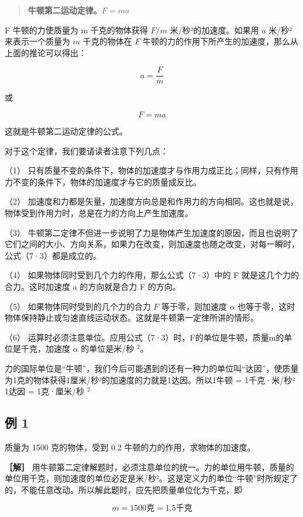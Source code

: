 \begin{quote}
\textbf{牛顿第二运动定律。\(F = ma\)}
\end{quote}

F 牛顿的力使质量为 m 千克的物体获得 \(F / m\) 米/秒²的加速度。如果用
\(a\) 米/秒²来表示一个质量为 \(m\) 千克的物体在 \(F\)
牛顿的力的作用下所产生的加速度，那么从上面的推论可以得出：

\[
a = \frac {F}{m}
\]

或

\[
F = m a \tag{7.3}
\]

这就是牛顿第二运动定律的公式。

对于这个定律，我们要请读者注意下列几点：

（1）
只有质量不变的条件下，物体的加速度才与作用力成正比；同样，只有作用力不变的条件下，物体的加速度才与它的质量成反比。

（2）
加速度和力都是矢量，加速度方向总是和作用力的方向相同。这也就是说，物体受到作用力时，总是在力的方向上产生加速度。

（3）
牛顿第二定律不但进一步说明了力是物体产生加速度的原因，而且也说明了它们之间的大小、方向关系，如果力在改变，则加速度也随之改变，对每一瞬时，公式（7·3）都是成立的。

（4） 如果物体同时受到几个力的作用，那么公式（7·3）中的 F
就是这几个力的合力。这时加速度 a 的方向就是合力 F 的方向。

（5） 如果物体同时受到的几个力的合力 \(F\) 等于零，则加速度 \(\alpha\)
也等于零，这时物体保持静止或匀速直线运动状态。这就是牛顿第一定律所讲的情形。

（6）
运算时必须注意单位。应用公式（7·3）时，F的单位是牛顿，质量m的单位是千克，加速度
\(\alpha\) 的单位是米/秒 \(^{2}\)。

力的国际单位是``牛顿''，我们今后可能遇到的还有一种力的单位叫``达因''，使质量为1克的物体获得1厘米/秒²的加速度的力就是1达因。所以1牛顿
= 1千克·米/秒² 1达因 = 1克·厘米/秒 \(^{2}\)

\subsection{例 1}\label{ux4f8b-1-7}

质量为 1500 克的物体，受到 0.2 牛顿的力的作用，求物体的加速度。

\textbf{［解］}
用牛顿第二定律解题时，必须注意单位的统一。力的单位用牛顿，质量的单位用千克，则加速度的单位必定是米/秒²。这是定义力的单位``牛顿''时所规定了的，不能任意改动。所以解此题时，应先把质量单位化为千克，即

\[
m = 1500 \text{克} = 1.5 \text{千克}
\]

